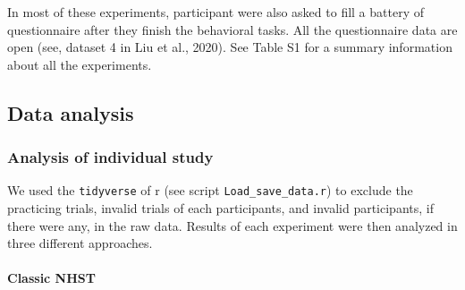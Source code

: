 \documentclass[
  english,
  man]{apa6}
\let\oldparagraph\paragraph
\renewcommand{\paragraph}[1]{\oldparagraph{#1}\mbox{}}
\begin{document}
In most of these experiments, participant were also asked to fill a battery of questionnaire after they finish the behavioral tasks. All the questionnaire data are open (see, dataset 4 in Liu et al., 2020). See Table S1 for a summary information about all the experiments.

\hypertarget{data-analysis}{%
\subsection{Data analysis}\label{data-analysis}}

\hypertarget{analysis-of-individual-study}{%
\subsubsection{Analysis of individual study}\label{analysis-of-individual-study}}

We used the \texttt{tidyverse} of r (see script \texttt{Load\_save\_data.r}) to exclude the practicing trials, invalid trials of each participants, and invalid participants, if there were any, in the raw data. Results of each experiment were then analyzed in three different approaches.

\hypertarget{classic-nhst}{%
\paragraph{Classic NHST}\label{classic-nhst}}
\end{document}
